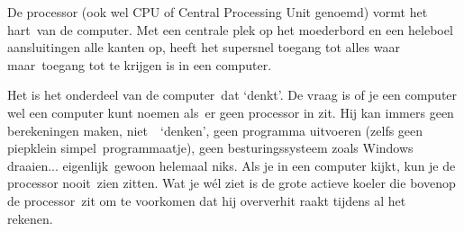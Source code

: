 De processor (ook wel CPU of Central Processing Unit genoemd) vormt het hart van de computer. Met een centrale plek op het moederbord en een heleboel aansluitingen alle kanten op, heeft het supersnel toegang tot alles waar maar toegang tot te krijgen is in een computer. 

Het is het onderdeel van de computer dat ‘denkt’. De vraag is of je een computer wel een computer kunt noemen als er geen processor in zit. Hij kan immers geen berekeningen maken, niet  ‘denken’, geen programma uitvoeren (zelfs geen piepklein simpel programmaatje), geen besturingssysteem zoals Windows draaien... eigenlijk gewoon helemaal niks. Als je in een computer kijkt, kun je de processor nooit zien zitten. Wat je wél ziet is de grote actieve koeler die bovenop de processor zit om te voorkomen dat hij oververhit raakt tijdens al het rekenen. 
